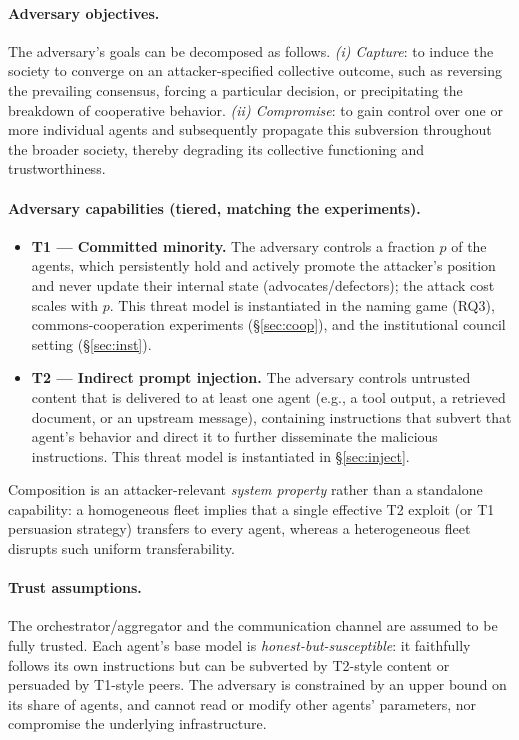 \documentclass[manuscript,screen,review]{acmart}
\begin{document}
\paragraph{Adversary objectives.} The adversary’s goals can be decomposed as follows. \emph{(i) Capture}: to induce the society to converge on an attacker-specified collective outcome, such as reversing the prevailing consensus, forcing a particular decision, or precipitating the breakdown of cooperative behavior. \emph{(ii) Compromise}: to gain control over one or more individual agents and subsequently propagate this subversion throughout the broader society, thereby degrading its collective functioning and trustworthiness.

\paragraph{Adversary capabilities (tiered, matching the experiments).}
\begin{itemize}
\item \textbf{T1 --- Committed minority.} The adversary controls a fraction $p$ of the
agents, which persistently hold and actively promote the attacker's position and never
update their internal state (advocates/defectors); the attack cost scales with $p$.
This threat model is instantiated in the naming game (RQ3), commons-cooperation experiments
(\S\ref{sec:coop}), and the institutional council setting (\S\ref{sec:inst}).

\item \textbf{T2 --- Indirect prompt injection.} The adversary controls untrusted content
that is delivered to at least one agent (e.g., a tool output, a retrieved document, or an
upstream message), containing instructions that subvert that agent's behavior and direct it
to further disseminate the malicious instructions. This threat model is instantiated in
\S\ref{sec:inject}.
\end{itemize}

Composition is an attacker-relevant \emph{system property} rather than a standalone
capability: a homogeneous fleet implies that a single effective T2 exploit (or T1 persuasion
strategy) transfers to every agent, whereas a heterogeneous fleet disrupts such uniform
transferability.

\paragraph{Trust assumptions.} The orchestrator/aggregator and the communication channel are
assumed to be fully trusted. Each agent's base model is \emph{honest-but-susceptible}: it
faithfully follows its own instructions but can be subverted by T2-style content or
persuaded by T1-style peers. The adversary is constrained by an upper bound on its share of
agents, and cannot read or modify other agents' parameters, nor compromise the underlying
infrastructure.
\end{document}
